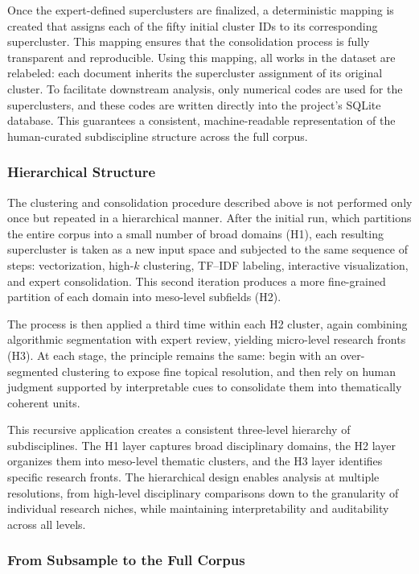 \documentclass{article}
\begin{document}
Once the expert-defined superclusters are finalized, a deterministic mapping is created that assigns each of the fifty initial cluster IDs to its corresponding supercluster. This mapping ensures that the consolidation process is fully transparent and reproducible. Using this mapping, all works in the dataset are relabeled: each document inherits the supercluster assignment of its original cluster. To facilitate downstream analysis, only numerical codes are used for the superclusters, and these codes are written directly into the project’s SQLite database. This guarantees a consistent, machine-readable representation of the human-curated subdiscipline structure across the full corpus.

\subsubsection{Hierarchical Structure}

The clustering and consolidation procedure described above is not performed only once but repeated in a hierarchical manner. After the initial run, which partitions the entire corpus into a small number of broad domains (H1), each resulting supercluster is taken as a new input space and subjected to the same sequence of steps: vectorization, high-$k$ clustering, TF–IDF labeling, interactive visualization, and expert consolidation. This second iteration produces a more fine-grained partition of each domain into meso-level subfields (H2).  

The process is then applied a third time within each H2 cluster, again combining algorithmic segmentation with expert review, yielding micro-level research fronts (H3). At each stage, the principle remains the same: begin with an over-segmented clustering to expose fine topical resolution, and then rely on human judgment supported by interpretable cues to consolidate them into thematically coherent units.  

This recursive application creates a consistent three-level hierarchy of subdisciplines. The H1 layer captures broad disciplinary domains, the H2 layer organizes them into meso-level thematic clusters, and the H3 layer identifies specific research fronts. The hierarchical design enables analysis at multiple resolutions, from high-level disciplinary comparisons down to the granularity of individual research niches, while maintaining interpretability and auditability across all levels.

\subsubsection{From Subsample to the Full Corpus}
\end{document}
